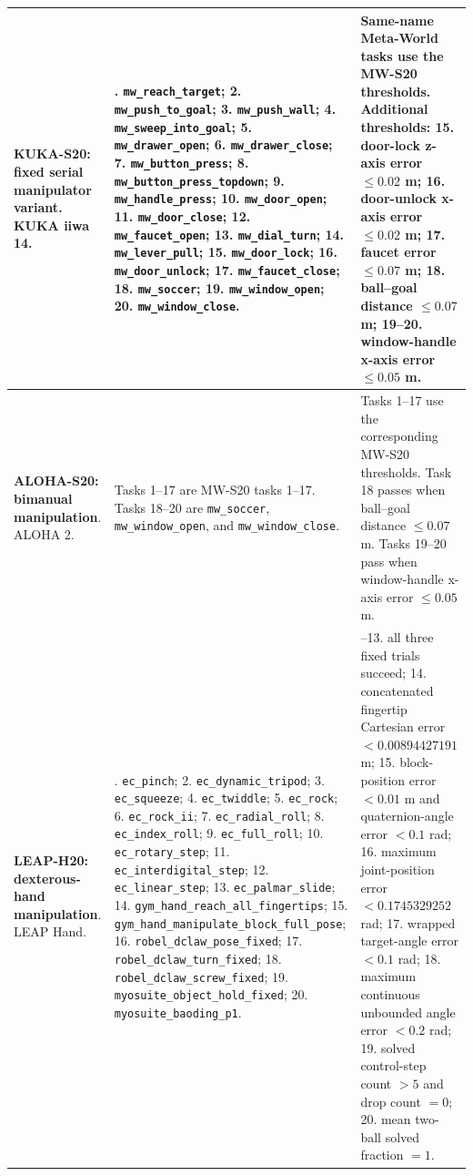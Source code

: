 \begin{landscape}
\begin{longtable}{@{}>{\raggedright\arraybackslash}p{47mm}>{\raggedright\arraybackslash}p{85mm}>{\raggedright\arraybackslash}p{84mm}@{}}
\midrule
\textbf{KUKA-S20: fixed serial manipulator variant}. KUKA iiwa 14. &
1. \texttt{mw\_reach\_target}; 2. \texttt{mw\_push\_to\_goal}; 3. \texttt{mw\_push\_wall}; 4. \texttt{mw\_sweep\_into\_goal}; 5. \texttt{mw\_drawer\_open}; 6. \texttt{mw\_drawer\_close}; 7. \texttt{mw\_button\_press}; 8. \texttt{mw\_button\_press\_topdown}; 9. \texttt{mw\_handle\_press}; 10. \texttt{mw\_door\_open}; 11. \texttt{mw\_door\_close}; 12. \texttt{mw\_faucet\_open}; 13. \texttt{mw\_dial\_turn}; 14. \texttt{mw\_lever\_pull}; 15. \texttt{mw\_door\_lock}; 16. \texttt{mw\_door\_unlock}; 17. \texttt{mw\_faucet\_close}; 18. \texttt{mw\_soccer}; 19. \texttt{mw\_window\_open}; 20. \texttt{mw\_window\_close}. &
Same-name Meta-World tasks use the MW-S20 thresholds. Additional thresholds: 15. door-lock z-axis error $\leq 0.02$ m; 16. door-unlock x-axis error $\leq 0.02$ m; 17. faucet error $\leq 0.07$ m; 18. ball--goal distance $\leq 0.07$ m; 19--20. window-handle x-axis error $\leq 0.05$ m. \\
\midrule
\textbf{ALOHA-S20: bimanual manipulation}. ALOHA 2. &
Tasks 1--17 are MW-S20 tasks 1--17. Tasks 18--20 are \texttt{mw\_soccer}, \texttt{mw\_window\_open}, and \texttt{mw\_window\_close}. &
Tasks 1--17 use the corresponding MW-S20 thresholds. Task 18 passes when ball--goal distance $\leq 0.07$ m. Tasks 19--20 pass when window-handle x-axis error $\leq 0.05$ m. \\
\midrule
\textbf{LEAP-H20: dexterous-hand manipulation}. LEAP Hand. &
1. \texttt{ec\_pinch}; 2. \texttt{ec\_dynamic\_tripod}; 3. \texttt{ec\_squeeze}; 4. \texttt{ec\_twiddle}; 5. \texttt{ec\_rock}; 6. \texttt{ec\_rock\_ii}; 7. \texttt{ec\_radial\_roll}; 8. \texttt{ec\_index\_roll}; 9. \texttt{ec\_full\_roll}; 10. \texttt{ec\_rotary\_step}; 11. \texttt{ec\_interdigital\_step}; 12. \texttt{ec\_linear\_step}; 13. \texttt{ec\_palmar\_slide}; 14. \texttt{gym\_hand\_reach\_all\_fingertips}; 15. \texttt{gym\_hand\_manipulate\_block\_full\_pose}; 16. \texttt{robel\_dclaw\_pose\_fixed}; 17. \texttt{robel\_dclaw\_turn\_fixed}; 18. \texttt{robel\_dclaw\_screw\_fixed}; 19. \texttt{myosuite\_object\_hold\_fixed}; 20. \texttt{myosuite\_baoding\_p1}. &
1--13. all three fixed trials succeed; 14. concatenated fingertip Cartesian error $< 0.00894427191$ m; 15. block-position error $< 0.01$ m and quaternion-angle error $< 0.1$ rad; 16. maximum joint-position error $< 0.1745329252$ rad; 17. wrapped target-angle error $< 0.1$ rad; 18. maximum continuous unbounded angle error $< 0.2$ rad; 19. solved control-step count $> 5$ and drop count $= 0$; 20. mean two-ball solved fraction $= 1$. \\

\end{longtable}
\end{landscape}
